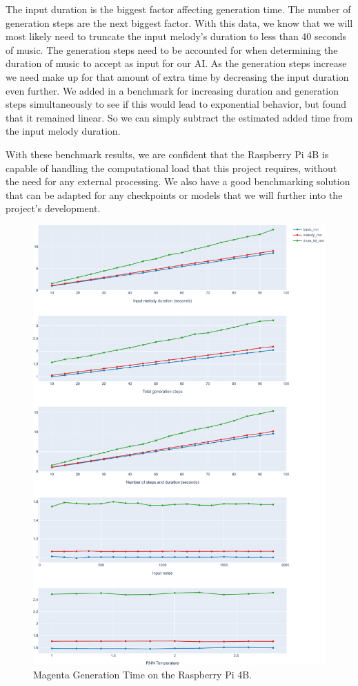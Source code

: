 The input duration is the biggest factor affecting generation time. The number of
generation steps are the next biggest factor. With this data, we know that we will most
likely need to truncate the input melody's duration to less than 40 seconds of music. The
generation steps need to be accounted for when determining the duration of music to accept
as input for our AI. As the generation steps increase we need make up for that amount of
extra time by decreasing the input duration even further. We added in a benchmark for
increasing duration and generation steps simultaneously to see if this would lead to
exponential behavior, but found that it remained linear. So we can simply subtract the
estimated added time from the input melody duration.

With these benchmark results, we are confident that the Raspberry Pi 4B is capable of
handling the computational load that this project requires, without the need for any
external processing. We also have a good benchmarking solution that can be adapted for any
checkpoints or models that we will further into the project's development.

\begin{figure}
  \centerline{ \includegraphics[width=.95\linewidth]{image/perf.pdf} }
  \caption{Magenta Generation Time on the Raspberry Pi 4B.}
  \label{fig:magentaperf}
\end{figure}

